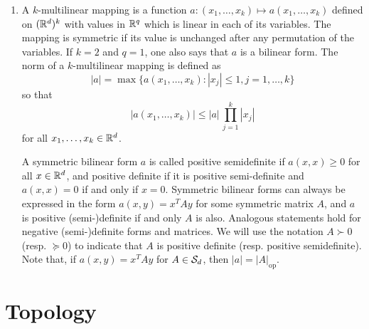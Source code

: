 \begin{enumerate}[label={\bf \arabic*.}]
 
 \item 
 A $k$-multilinear mapping is a function $a: (x_1, \ldots, x_k) \mapsto a(x_1, \ldots, x_k)$ defined on $({\mathbb{R}}^d)^k$ with values in ${\mathbb{R}}^q$ which is linear in each of its variables. The mapping is symmetric if its value is unchanged after any permutation of the variables. If $k=2$ and $q=1$, one also says that $a$ is a bilinear form. The norm of a $k$-multilinear mapping is defined as
 \[
 |a| = \max\{a(x_1, \ldots, x_k): |x_j|\leq 1,  j=1, \ldots, k\}
 \]
 so that 
 \[
 |a(x_1, \ldots, x_k)| \leq |a| \, \prod_{j=1}^k |x_j|
 \]
 for all $x_1, \ldots, x_k\in {\mathbb{R}}^d$.
 
A symmetric bilinear form $a$ is called positive semidefinite if $a(x,x) \geq 0$ for all $x\in {\mathbb{R}}^d$, and positive definite if it is positive semi-definite and $a(x,x)=0$ if and only if $x=0$. Symmetric bilinear forms can always be expressed in the form $a(x,y) = x^TAy$ for some symmetric matrix $A$, and $a$ is positive (semi-)definite if and only $A$ is also. Analogous statements hold for negative (semi-)definite forms and matrices. We will use the notation $A \succ 0$ (resp. $\succeq 0$) to indicate that $A$ is positive definite (resp. positive semidefinite). Note that, if $a(x,y) = x^TAy$ for $A\in {\mathcal S}_d$, then $|a| = |A|_{\mathrm{op}}$.
 \end{enumerate}
 
 \section{Topology}
 
